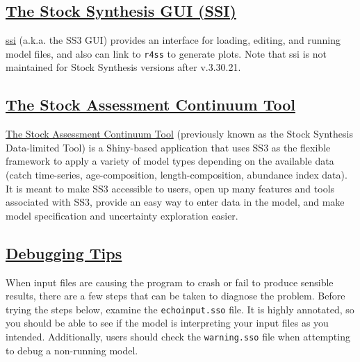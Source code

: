 \hypertarget{SSI}{}
\subsection[The Stock Synthesis GUI (SSI)]{\protect\hyperlink{SSI}{The Stock Synthesis GUI (SSI)}}
\href{https://vlab.noaa.gov/web/stock-synthesis/document-library/-/document_library/0LmuycloZeIt/view/5042951}{\gls{ssi}} (a.k.a. the SS3 GUI) provides an interface for loading, editing, and running model files, and also can link to \texttt{r4ss} to generate plots. Note that \gls{ssi} is not maintained for Stock Synthesis versions after v.3.30.21.

\hypertarget{SAC}{}
\subsection[The Stock Assessment Continuum Tool]{\protect\hyperlink{SAC}{The Stock Assessment Continuum Tool}}
\href{https://github.com/shcaba/SS-DL-tool}{The Stock Assessment Continuum Tool} (previously known as the Stock Synthesis Data-limited Tool) is a Shiny-based application that uses SS3 as the flexible framework to apply a variety of model types depending on the available data (catch time-series, age-composition, length-composition, abundance index data). It is meant to make SS3 accessible to users, open up many features and tools associated with SS3, provide an easy way to enter data in the model, and make model specification and uncertainty exploration easier.

\hypertarget{Debugging}{}
\subsection[Debugging Tips]{\protect\hyperlink{Debugging}{Debugging Tips}}
When input files are causing the program to crash or fail to produce sensible results, there are a few steps that can be taken to diagnose the problem. Before trying the steps below, examine the \texttt{echoinput.sso} file. It is highly annotated, so you should be able to see if the model is interpreting your input files as you intended. Additionally, users should check the \texttt{warning.sso} file when attempting to debug a non-running model.

